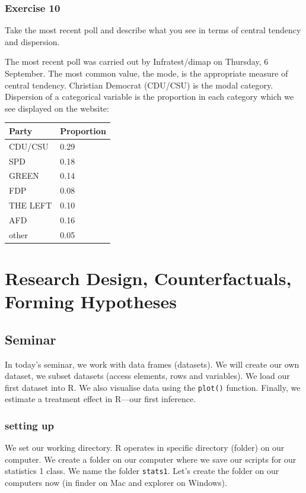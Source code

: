 \documentclass[]{article}
\theoremstyle{definition}
\theoremstyle{definition}
\theoremstyle{definition}
\theoremstyle{remark}
\begin{document}
\subsubsection{Exercise 10}\label{exercise-10}

Take the most recent poll and describe what you see in terms of central
tendency and dispersion.

The most recent poll was carried out by Infratest/dimap on Thursday, 6
September. The most common value, the mode, is the appropriate measure
of central tendency. Christian Democrat (CDU/CSU) is the modal category.
Dispersion of a categorical variable is the proportion in each category
which we see displayed on the website:

\begin{longtable}[]{@{}ll@{}}
\toprule
Party & Proportion\tabularnewline
\midrule
\endhead
CDU/CSU & 0.29\tabularnewline
SPD & 0.18\tabularnewline
GREEN & 0.14\tabularnewline
FDP & 0.08\tabularnewline
THE LEFT & 0.10\tabularnewline
AFD & 0.16\tabularnewline
other & 0.05\tabularnewline
\bottomrule
\end{longtable}

\section{Research Design, Counterfactuals, Forming
Hypotheses}\label{research-design-counterfactuals-forming-hypotheses}

\subsection{Seminar}\label{seminar-1}

In today's seminar, we work with data frames (datasets). We will create
our own dataset, we subset datasets (access elements, rows and
variables). We load our first dataset into R. We also visualise data
using the \texttt{plot()} function. Finally, we estimate a treatment
effect in R---our first inference.

\subsubsection{setting up}\label{setting-up}

We set our working directory. R operates in specific directory (folder)
on our computer. We create a folder on our computer where we save our
scripts for our statistics 1 class. We name the folder \texttt{stats1}.
Let's create the folder on our computers now (in finder on Mac and
explorer on Windows).
\end{document}
